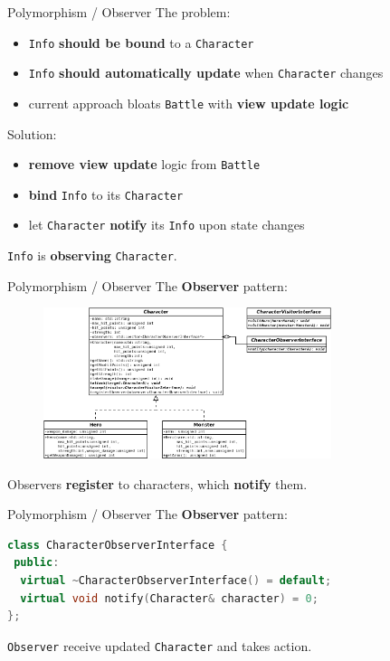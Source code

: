 \documentclass[11pt]{beamer}
\renewcommand{\emph}[1]{\textbf{#1}}
\begin{document}
\begin{frame}{Polymorphism / Observer}
 The problem:
 
 \begin{itemize}
  \item \texttt{Info} \emph{should be bound} to a \texttt{Character}
  \item \texttt{Info} \emph{should automatically update} when \texttt{Character} changes
  \item current approach bloats \texttt{Battle} with \emph{view update logic}
 \end{itemize}
 
 Solution:
 \begin{itemize}
  \item \emph{remove view update} logic from \texttt{Battle}
  \item \emph{bind} \texttt{Info} to its \texttt{Character}
  \item let \texttt{Character} \emph{notify} its \texttt{Info} upon state changes
 \end{itemize}
 
 \texttt{Info} is \emph{observing} \texttt{Character}.
\end{frame}

\begin{frame}{Polymorphism / Observer}
 The \emph{Observer} pattern:
 \begin{figure}
  \includegraphics[width=0.75\textwidth]{assets/diagram-battle-scene-3}
 \end{figure}
 
 Observers \emph{register} to characters, which \emph{notify} them.
\end{frame}

\begin{frame}[fragile]{Polymorphism / Observer}
 The \emph{Observer} pattern:

 \begin{lstlisting}[language=C++]
class CharacterObserverInterface {
 public:
  virtual ~CharacterObserverInterface() = default;
  virtual void notify(Character& character) = 0;
};
\end{lstlisting}

 \texttt{Observer} receive updated \texttt{Character} and takes action.
\end{frame}
\end{document}
